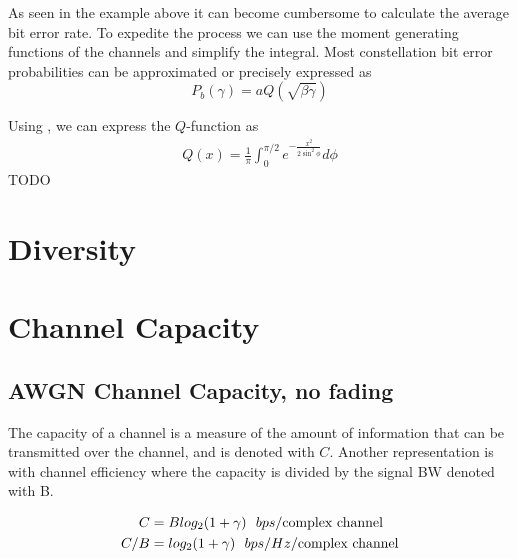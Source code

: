 \documentclass[12pt]{report} %
\begin{document}
As seen in the example above it can become cumbersome to calculate the average
bit error rate. To expedite the process we can use the moment generating
functions of the channels and simplify the integral. Most constellation bit
error probabilities can be approximated or precisely expressed as $$P_b(\gamma)
  = a Q( \sqrt{\beta\gamma})$$

Using \cite{Craig258319}, we can express the $Q$-function as
\begin{align}
  Q(x) = \frac{1}{\pi}\int_{0}^{\pi/2} e^{-\frac{x^2}{2 \sin^2\phi}}d\phi
\end{align}
TODO

\chapter{Diversity}


\chapter{Channel Capacity}

\section{AWGN Channel Capacity, no fading}
The capacity of a channel is a measure of the amount of information that can be
transmitted over the channel, and is denoted with $C$. Another representation is
with channel efficiency where the capacity is divided by the signal \gls{BW}
denoted with B.

\begin{align}
  C   & = B log_{2}(1+\gamma) ~~ bps/ \text{complex channel}           \\
  C/B & = log_{2}(1+\gamma) ~~ bps/Hz/ \text{complex channel\nonumber}
\end{align}
\end{document}
